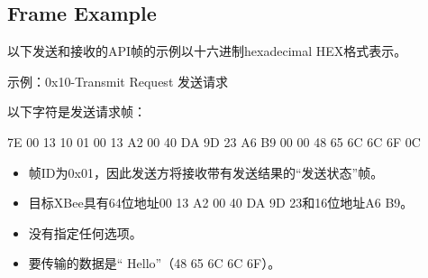 
\subsection{Frame Example}

以下发送和接收的API帧的示例以十六进制hexadecimal HEX格式表示。

示例：0x10-Transmit Request 发送请求

以下字符是发送请求帧：

7E 00 13 10 01 00 13 A2 00 40 DA 9D 23 A6 B9 00 00 48 65 6C 6C 6F 0C

\begin{itemize}
    \item 帧ID为0x01，因此发送方将接收带有发送结果的“发送状态”帧。
    \item 目标XBee具有64位地址00 13 A2 00 40 DA 9D 23和16位地址A6 B9。
    \item 没有指定任何选项。
    \item 要传输的数据是“ Hello”（48 65 6C 6C 6F）。
\end{itemize}


